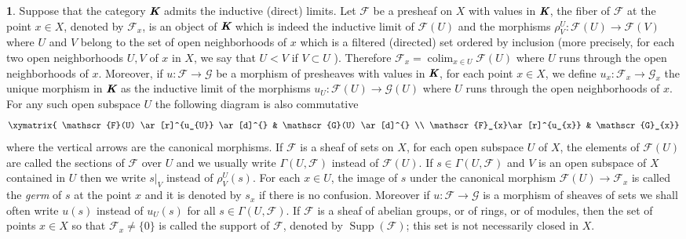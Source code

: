 \documentclass[12pt]{amsart}
\newcommand{\colimit}{\operatorname{colim}}
\newcommand{\Supp}{\operatorname{Supp}}
\theoremstyle{definition}
\newtheorem{bk}[proposition]{}
\begin{document}
\begin{bk}\label{I: 3.1.6} Suppose that the category  $\emph{\textbf{K}}$ admits the inductive (direct) limits. Let $\mathscr{F}$ be a presheaf on $X$ with values in $\emph{\textbf{K}}$, the fiber of  $\mathscr{F}$ at the point $x\in X$, denoted by $\mathscr{F}_{x}$, is an object of $\emph{\textbf{K}}$ which is indeed the inductive limit of  $\mathscr{F}(U)$ and the morphisms $\rho_{V}^{U}: \mathscr{F}(U)\rightarrow\mathscr{F}(V)$ where $U$ and $V$ belong to the set of open neighborhoods of $x$ which is a filtered (directed) set ordered by inclusion (more precisely, for each two open neighborhoods $U,V$ of $x$ in $X$, we say that $U< V$ if $V\subset U$ ). Therefore $\mathscr{F}_{x}=\colimit_{x\in U}\mathscr{F}(U)$ where $U$ runs through the open neighborhoods of $x$. Moreover, if $u: \mathscr{F}\rightarrow\mathscr{G}$ be a morphism of presheaves with values in $\emph{\textbf{K}}$, for each point $x\in X$, we define $u_{x}:\mathscr{F}_{x}\rightarrow\mathscr{G}_{x}$ the unique morphism in $\emph{\textbf{K}}$ as the inductive limit of the morphisms $u_{U}: \mathscr{F}(U)\rightarrow\mathscr{G}(U)$ where $U$ runs through the open neighborhoods of $x$. For any such open subspace $U$ the following diagram is also commutative $$\xymatrix{
\mathscr{F}(U) \ar[r]^{u_{U}} \ar[d]^{} & \mathscr{G}(U) \ar[d]^{} \\ \mathscr{F}_{x}\ar[r]^{u_{x}} & \mathscr{G}_{x}} $$ where the vertical arrows are the canonical morphisms.
If $\mathscr{F}$ is a sheaf of sets on $X$, for each open subspace $U$ of $X$, the elements of $\mathscr{F}(U)$ are called the sections of $\mathscr{F}$ over $U$ and we usually write $\Gamma(U, \mathscr{F})$ instead of $\mathscr{F}(U)$. If $s\in\Gamma(U, \mathscr{F})$ and $V$ is an open subspace of $X$ contained in $U$ then we write $s|_{V}$ instead of $\rho_{V}^{U}(s)$. For each $x\in U$, the image of $s$ under the canonical morphism $\mathscr{F}(U)\rightarrow\mathscr{F}_{x}$ is called the \emph{germ} of $s$ at the point $x$ and it is denoted by $s_{x}$ if there is no confusion. Moreover if $u:\mathscr{F}\rightarrow\mathscr{G}$ is a morphism of sheaves of sets we shall often write $u(s)$ instead of $u_{U}(s)$ for all $s\in\Gamma(U, \mathscr{F})$. If $\mathscr{F}$ is a sheaf of abelian groups, or of rings, or of modules, then the set of points $x\in X$ so that $\mathscr{F}_{x}\neq\{0\}$ is called the support of  $\mathscr{F}$, denoted by $\Supp(\mathscr{F})$; this set is not necessarily closed in $X$.

\end{bk}
\end{document}

